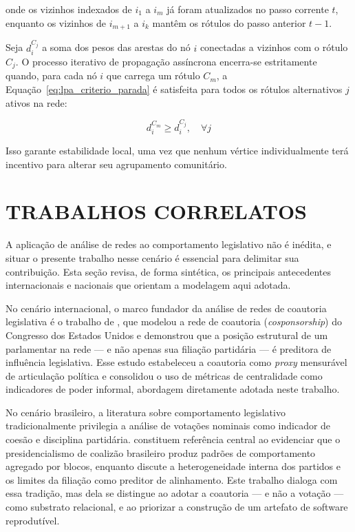 \documentclass[
      12pt,
      a4paper,
      openright,
      oneside,
      chapter=TITLE,
      section=TITLE,
      english,
      french,
      spanish,
      brazilian
    ]{abntex2}
\begin{document}
    onde os vizinhos indexados de $i_1$ a $i_m$ já foram atualizados no passo corrente $t$, enquanto os vizinhos de $i_{m+1}$ a $i_k$ mantêm os rótulos do passo anterior $t-1$. 
    
    Seja $d_i^{C_j}$ a soma dos pesos das arestas do nó $i$ conectadas a vizinhos com o rótulo $C_j$. O processo iterativo de propagação assíncrona encerra-se estritamente quando, para cada nó $i$ que carrega um rótulo $C_m$, a Equação~\ref{eq:lpa_criterio_parada} é satisfeita para todos os rótulos alternativos $j$ ativos na rede:
    
    \begin{equation}
    d_i^{C_m} \ge d_i^{C_j}, \quad \forall j
    \label{eq:lpa_criterio_parada}
    \end{equation}
    
    Isso garante estabilidade local, uma vez que nenhum vértice individualmente terá incentivo para alterar seu agrupamento comunitário.
    
    \section{TRABALHOS CORRELATOS}
    
    A aplicação de análise de redes ao comportamento legislativo não é inédita, e situar o presente trabalho nesse cenário é essencial para delimitar sua contribuição. Esta seção revisa, de forma sintética, os principais antecedentes internacionais e nacionais que orientam a modelagem aqui adotada.
    
    No cenário internacional, o marco fundador da análise de redes de coautoria legislativa é o trabalho de , que modelou a rede de coautoria (\textit{cosponsorship}) do Congresso dos Estados Unidos e demonstrou que a posição estrutural de um parlamentar na rede --- e não apenas sua filiação partidária --- é preditora de influência legislativa. Esse estudo estabeleceu a coautoria como \textit{proxy} mensurável de articulação política e consolidou o uso de métricas de centralidade como indicadores de poder informal, abordagem diretamente adotada neste trabalho.
    
    No cenário brasileiro, a literatura sobre comportamento legislativo tradicionalmente privilegia a análise de votações nominais como indicador de coesão e disciplina partidária.  constituem referência central ao evidenciar que o presidencialismo de coalizão brasileiro produz padrões de comportamento agregado por blocos, enquanto  discute a heterogeneidade interna dos partidos e os limites da filiação como preditor de alinhamento. Este trabalho dialoga com essa tradição, mas dela se distingue ao adotar a coautoria --- e não a votação --- como substrato relacional, e ao priorizar a construção de um artefato de software reprodutível.
    
\end{document}
